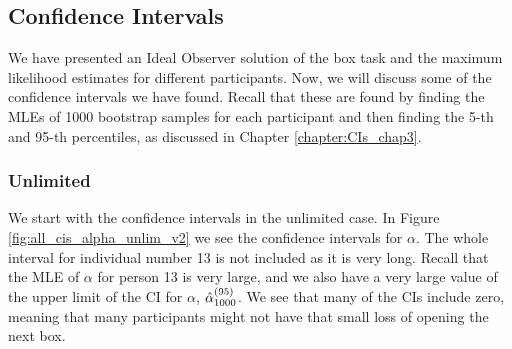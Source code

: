\subsection{Confidence Intervals}
\label{chapter:results_cis}
We have presented an Ideal Observer solution of the box task and the maximum likelihood estimates for different participants. Now, we will discuss some of the confidence intervals we have found. Recall that these are found by finding the MLEs of 1000 bootstrap samples for each participant and then finding the 5-th and 95-th percentiles, as discussed in Chapter \ref{chapter:CIs_chap3}. 

\subsubsection{Unlimited}
\label{chapter:cis_unlimited}
We start with the confidence intervals in the unlimited case. In Figure \ref{fig:all_cis_alpha_unlim_v2} we see the confidence intervals for $\alpha$. The whole interval for individual number 13 is not included as it is very long. Recall that the MLE of $\alpha$ for person 13 is very large, and we also have a very large value of the upper limit of the CI for $\alpha$, $\hat{\alpha}_{1000}^{(95)}$. We see that many of the CIs include zero, meaning that many participants might not have that small loss of opening the next box. 
